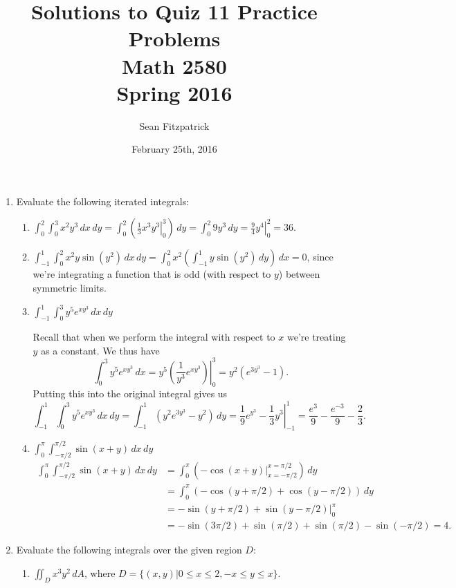 \documentclass[letterpaper,12pt]{article}
\title{Solutions to Quiz 11 Practice Problems\\Math 2580\\Spring 2016}
\author{Sean Fitzpatrick}
\date{February 25th, 2016}
\newcommand{\di}{\displaystyle}
\begin{document}
 \maketitle

\begin{enumerate}
 \item Evaluate the following iterated integrals:
\begin{enumerate}
 \item $\di \int_0^2\int_0^3x^2y^3\,dx\,dy=\int_0^2\left(\left.\frac{1}{3}x^3y^3\right|_0^3\right)\,dy = \int_0^2 9y^3\,dy = \left.\frac{9}{4}y^4\right|_0^2 = 36$.

 \item $\di \int_{-1}^1\int_0^2 x^2y\sin(y^2)\,dx\,dy = \int_0^2 x^2\left(\int_{-1}^1y\sin(y^2)\,dy\right)\,dx = 0$, since we're integrating a function that is odd (with respect to $y$) between symmetric limits.

 \item $\di \int_{-1}^1\int_0^3 y^5e^{xy^3}\,dx\,dy$

\medskip

Recall that when we perform the integral with respect to $x$ we're treating $y$ as a constant. We thus have
\[
 \int_0^3 y^5e^{xy^3}\,dx = \left.y^5\left(\frac{1}{y^3}e^{xy^3}\right)\right|_0^3 = y^2(e^{3y^3}-1).
\]
Putting this into the original integral gives us
\[
 \int_{-1}^1\int_0^3 y^5e^{xy^3}\,dx\,dy = \int_{-1}^1 (y^2e^{3y^3}-y^2)\,dy = \left.\frac{1}{9}e^{y^3}-\frac{1}{3}y^3\right|_{-1}^1 = \frac{e^3}{9}-\frac{e^{-3}}{9}-\frac{2}{3}.
\]

 \item $\di \int_0^\pi\int_{-\pi/2}^{\pi/2}\sin(x+y)\,dx\,dy$
\begin{align*}
 \int_0^\pi\int_{-\pi/2}^{\pi/2}\sin(x+y)\,dx\,dy & = \int_0^\pi\left(\left.-\cos(x+y)\right|_{x=-\pi/2}^{x=\pi/2}\right)\,dy\\
& = \int_0^\pi(-\cos(y+\pi/2)+\cos(y-\pi/2))\,dy\\
& = \left. -\sin(y+\pi/2)+\sin(y-\pi/2)\right|_0^\pi\\
& = -\sin(3\pi/2)+\sin(\pi/2)+\sin(\pi/2)-\sin(-\pi/2) = 4.
\end{align*}

\end{enumerate}
 \item Evaluate the following integrals over the given region $D$:
\begin{enumerate}
 \item $\di \iint_D x^3y^2\,dA$, where $D=\{(x,y) | 0\leq x\leq 2, -x\leq y\leq x\}$.


\end{enumerate}
\end{enumerate}
\end{document}
